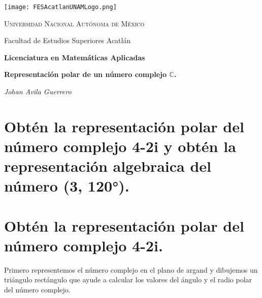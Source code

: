 \documentclass[a4paper,12pt]{article}
\begin{document}
\begin{titlepage}
    \centering
    \texttt{[image: FESAcatlanUNAMLogo.png]} %
    \vspace{1cm}
    
    {\scshape\large Universidad Nacional Autónoma de México \par}
    {\large Facultad de Estudios Superiores Acatlán \par}
    \vspace{1.5cm}
    
    {\Large\bfseries Licenciatura en Matemáticas Aplicadas \par}
    \vspace{2cm}
    
    {\Huge\bfseries Representación polar de un número complejo \(\mathbb{C}\).

    \par}
    \vspace{2cm}
    
    {\Large\itshape Johan Avila Guerrero \par}
    \vfill
    
    
    \vfill
    
\end{titlepage}



\section*{Obtén la representación polar del número complejo 4-2i y obtén la representación algebraica del número (3, 120°).}
\section{Obtén la representación polar del número complejo 4-2i.}

Primero representemos el número complejo en el plano de argand y dibujemos un triángulo rectángulo que ayude a calcular los valores del ángulo y el radio polar del número complejo.
\end{document}
